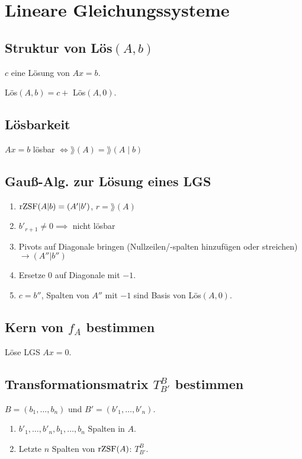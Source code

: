 \section*{Lineare Gleichungssysteme}

\subsection*{Struktur von Lös$(A,b)$}
$c$ eine Lösung von $Ax=b$.

Lös$(A,b)=c+$ Lös$(A,0)$.

\subsection*{Lösbarkeit}
$Ax=b$ lösbar $\Leftrightarrow \rang(A) = \rang(A \mid b)$

\subsection*{Gauß-Alg. zur Lösung eines LGS}
\begin{enumerate}
	\item $\operatorname{rZSF}(A|b)=(A'|b')$, $r=\rang(A)$
	\item $b'_{r+1}\neq 0 \implies$ nicht lösbar
	\item Pivots auf Diagonale bringen (Nullzeilen/-spalten hinzufügen oder streichen) $\rightarrow (A''|b'')$
	\item Ersetze 0 auf Diagonale mit $-1$.
	\item $c=b''$, Spalten von $A''$ mit $-1$ sind Basis von Lös$(A,0)$.
\end{enumerate}

\subsection*{Kern von $f_A$ bestimmen}
Löse LGS $Ax=0$.

\subsection*{Transformationsmatrix $T_{B'}^B$ bestimmen}
$B=(b_1,\dots,b_n)$ und $B'=(b'_1,\dots,b'_n)$.

\begin{enumerate}
	\item $b'_1,\dots,b'_n,b_1,\dots,b_n$ Spalten in $A$.
	\item Letzte $n$ Spalten von $\operatorname{rZSF}(A)$: $T_{B'}^B$.
\end{enumerate}

